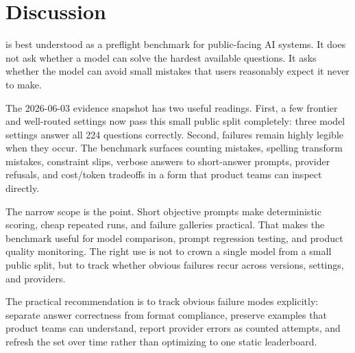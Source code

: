 \section{Discussion}

\benchmarkname{} is best understood as a preflight benchmark for public-facing
AI systems. It does not ask whether a model can solve the hardest available
questions. It asks whether the model can avoid small mistakes that users
reasonably expect it never to make.

The 2026-06-03 evidence snapshot has two useful readings. First, a few frontier
and well-routed settings now pass this small public split completely: three
model settings answer all 224 questions correctly. Second, failures remain highly
legible when they occur. The benchmark surfaces counting mistakes, spelling
transform mistakes, constraint slips, verbose answers to short-answer prompts,
provider refusals, and cost/token tradeoffs in a form that product teams can
inspect directly.

The narrow scope is the point. Short objective prompts make deterministic
scoring, cheap repeated runs, and failure galleries practical. That makes the
benchmark useful for model comparison, prompt regression testing, and product
quality monitoring. The right use is not to crown a single model from a small
public split, but to track whether obvious failures recur across versions,
settings, and providers.

The practical recommendation is to track obvious failure modes explicitly:
separate answer correctness from format compliance, preserve examples that
product teams can understand, report provider errors as counted attempts, and
refresh the set over time rather than optimizing to one static leaderboard.
